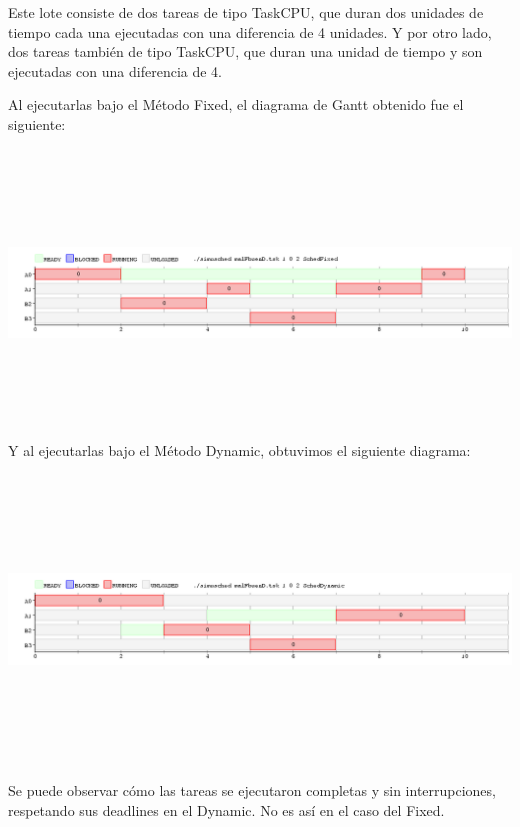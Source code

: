 \documentclass[a4paper]{article}
\begin{document}
Este lote consiste de dos tareas de tipo TaskCPU, que duran dos unidades de tiempo cada una ejecutadas con una diferencia de 4 unidades. Y por otro lado, dos tareas tambi\'en de tipo TaskCPU, que duran una unidad de tiempo y son ejecutadas con una diferencia de 4.\\

\bigskip

Al ejecutarlas bajo el M\'etodo Fixed, el diagrama de Gantt obtenido fue el siguiente:

\includegraphics[width=\textwidth,height=3.0in,keepaspectratio]{imagenes/ej9/fixed.png} 
\bigskip
Y al ejecutarlas bajo el M\'etodo Dynamic, obtuvimos el siguiente diagrama:

\includegraphics[width=\textwidth,height=3.0in,keepaspectratio]{imagenes/ej9/dynamic.png} 

\bigskip

Se puede observar c\'omo las tareas se ejecutaron completas y sin interrupciones, respetando sus deadlines en el Dynamic. No es as\'i en el caso del Fixed.\\
\end{document}
